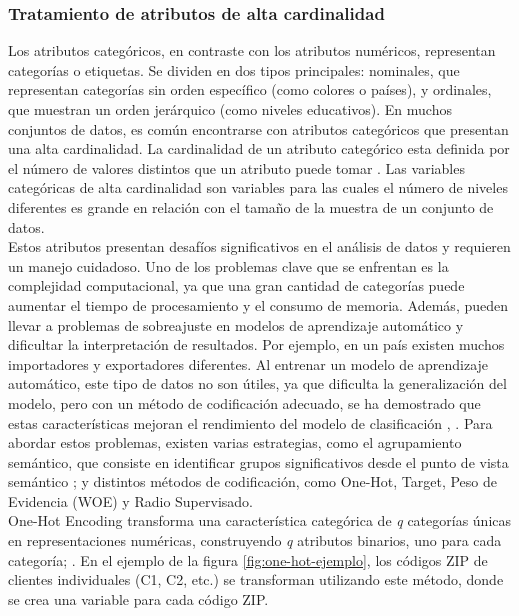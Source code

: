 \subsubsection*{Tratamiento de atributos de alta cardinalidad}\label{alta-cardinalidad}
Los atributos categóricos, en contraste con los atributos numéricos, representan categorías o etiquetas. Se dividen en dos tipos principales: nominales, que representan categorías sin orden específico (como colores o países), y ordinales, que muestran un orden jerárquico (como niveles educativos). En muchos conjuntos de datos, es común encontrarse con atributos categóricos que presentan una alta cardinalidad. La cardinalidad de un atributo categórico esta definida por el número de valores distintos que un atributo puede tomar \citep{moeyersoms2015including}. Las variables categóricas de alta cardinalidad son variables para las cuales el número de niveles diferentes es grande en relación con el tamaño de la muestra de un conjunto de datos. \\
Estos atributos presentan desafíos significativos en el análisis de datos y requieren un manejo cuidadoso. Uno de los problemas clave que se enfrentan es la complejidad computacional, ya que una gran cantidad de categorías puede aumentar el tiempo de procesamiento y el consumo de memoria. Además, pueden llevar a problemas de sobreajuste en modelos de aprendizaje automático y dificultar la interpretación de resultados. Por ejemplo, en un país existen muchos importadores y exportadores diferentes. Al entrenar un modelo de aprendizaje automático, este tipo de datos no son útiles, ya que dificulta la generalización del modelo, pero con un método de codificación adecuado, se ha demostrado que estas características mejoran el rendimiento del modelo de clasificación \citep{hooi2022feature}, \citep{cerda2020encoding}. Para abordar estos problemas, existen varias estrategias, como el agrupamiento semántico, que consiste en identificar grupos significativos desde el punto de vista semántico \citep{cerda2018similarity}; y distintos métodos de codificación, como One-Hot, Target, Peso de Evidencia (WOE) y Radio Supervisado. \\
One-Hot Encoding transforma una característica categórica de \textit{q} categorías únicas en representaciones numéricas, construyendo \textit{q} atributos binarios, uno para cada categoría; \citep{avanzi2023machine}. En el ejemplo de la figura \ref{fig:one-hot-ejemplo}, los códigos ZIP de clientes individuales (C1, C2, etc.) se transforman utilizando este método, donde se crea una variable  para cada código ZIP. \\
